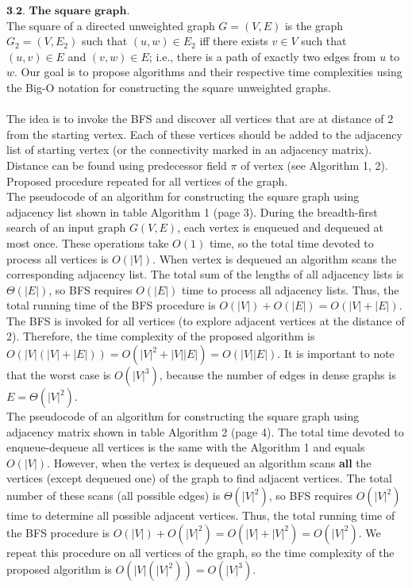 \documentclass[11pt]{article}
\begin{document}
\noindent $\textbf{3.2. The square graph}$.\\

\noindent The square of a directed unweighted graph $G = (V, E)$ is the graph $G_{2} = (V, E_{2})$ such that $(u, w) \in E_{2}$ iff there exists $v \in V$ such that $(u, v) \in E$ and $(v, w) \in E$; i.e., there is a path of exactly two edges from $u$ to $w$. Our goal is to propose algorithms and their respective time complexities using the Big-O notation for constructing the square unweighted graphs.
\\ 
\\
\noindent The idea is to invoke the BFS and discover all vertices that are at distance of 2 from the starting vertex. Each of these vertices should be added to the adjacency list of starting vertex (or the connectivity marked in an adjacency matrix). Distance can be found using predecessor field $\pi$ of vertex (see Algorithm 1, 2). Proposed procedure repeated for all vertices of the graph. 
\\

\noindent The pseudocode of an algorithm for constructing the square graph using adjacency list shown in table Algorithm 1 (page 3). During the breadth-first search of an input graph $G(V, E)$, each vertex is enqueued and dequeued at most once. These operations take $O(1)$ time, so the total time devoted to process all vertices is $O(|V|)$. When vertex is dequeued an algorithm scans the corresponding adjacency list. The total sum of the lengths of all adjacency lists is $\Theta(|E|)$, so BFS requires $O(|E|)$ time to process all adjacency lists. Thus, the total running time of the BFS procedure is $O(|V|)+O(|E|)=O(|V|+|E|)$. The BFS is invoked for all vertices (to explore adjacent vertices at the distance of 2). Therefore, the time complexity of the proposed algorithm is $O(|V|(|V|+|E|))=O(|V|^{2}+|V||E|)=O(|V||E|)$. It is important to note that the worst case is $O(|V|^{3})$, because the number of edges in dense graphs is $E=\Theta(|V|^{2})$.
\\

\noindent The pseudocode of an algorithm for constructing the square graph using adjacency matrix shown in table Algorithm 2 (page 4). The total time devoted to enqueue-dequeue all vertices is the same with the Algorithm 1 and equals $O(|V|)$. However, when the vertex is dequeued an algorithm scans \textbf{all} the vertices (except dequeued one) of the graph to find adjacent vertices. The total number of these scans (all possible edges) is $\Theta(|V|^{2})$, so BFS requires $O(|V|^{2})$ time to determine all possible adjacent vertices. Thus, the total running time of the BFS procedure is $O(|V|)+O(|V|^{2})=O(|V|+|V|^{2})=O(|V|^{2})$. We repeat this procedure on all vertices of the graph, so the time complexity of the proposed algorithm is $O(|V|(|V|^{2}))=O(|V|^{3})$.
\end{document}

